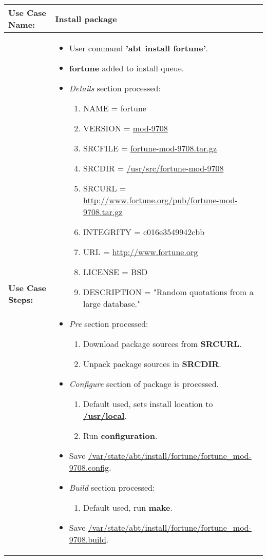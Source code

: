 \medskip

\begin{tabularx}{\linewidth}{|l|X|}
\hline
\textbf{Use Case Name:} & \textbf{Install package} \\
\hline
\textbf{Use Case Steps:} & 
\begin{minipage}{\linewidth} 
  \vspace{0.05em}
  \begin{itemize}
    \item User command \textbf{'abt install fortune'}.
    \item \textbf{fortune} added to install queue.
    \item \emph{Details} section processed:
    \begin{enumerate}
      \item NAME = fortune
      \item VERSION = \url{mod-9708}
      \item SRCFILE = \url{fortune-mod-9708.tar.gz}
      \item SRCDIR = \url{/usr/src/fortune-mod-9708}
      \item SRCURL = \url{http://www.fortune.org/pub/fortune-mod-9708.tar.gz}
      \item INTEGRITY = c016e3549942cbb
      \item URL = \url{http://www.fortune.org}
      \item LICENSE = BSD
      \item DESCRIPTION = "Random quotations from a large database."
    \end{enumerate}
    \item \emph{Pre} section processed:
    \begin{enumerate}
      \item Download package sources from \textbf{SRCURL}.
      \item Unpack package sources in \textbf{SRCDIR}.
    \end{enumerate}
    \item \emph{Configure} section of package is processed.
    \begin{enumerate}
      \item Default used, sets install location to \textbf{\url{/usr/local}}.
      \item Run \textbf{configuration}.
    \end{enumerate}
    \item Save \url{/var/state/abt/install/fortune/fortune_mod-9708.config}.
    \item \emph{Build} section processed:
    \begin{enumerate}
      \item Default used, run \textbf{make}.
    \end{enumerate}
    \item Save \url{/var/state/abt/install/fortune/fortune_mod-9708.build}.
  \end{itemize}
  \vspace{0.05em}
\end{minipage}
\\
\hline 
\end{tabularx}

